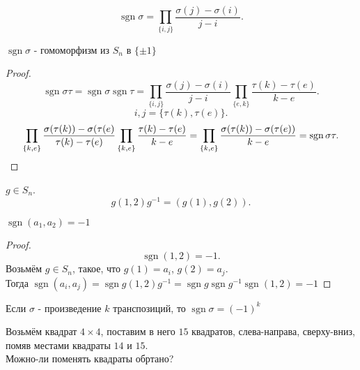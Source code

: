 \documentclass[11pt, oneside]{article}   	%
\DeclareMathOperator{\sgn}{sgn}
\begin{document}
    \begin{dlemma}
        \[ \sgn \sigma = \prod\limits_{\{i, j\}} \frac{\sigma(j)-\sigma(i)}{j-i}   .\] 
    \end{dlemma}
    \begin{dlemma}
        $\sgn \sigma$ - гомоморфизм из $S_n$ в $\{\pm 1\} $
        \begin{proof}
            \[ \sgn \sigma\tau = \sgn\sigma\sgn\tau = \prod\limits_{\{i,j\}} \frac{\sigma(j)-\sigma(i)}{j-i}\prod\limits_{\{e, k\}} \frac{\tau(k)-\tau(e)}{k-e}     .\]
        \[ {i, j} = \{\tau(k), \tau(e)\}   .\] 
        \[ \prod\limits_{\{k, e\} } \frac{\sigma(\tau(k))-\sigma(\tau(e)}{\tau(k)-\tau(e)}\prod\limits_{\{k, e\} }\frac{\tau(k)-\tau(e)}{k-e} = \prod\limits_{\{k, e\} } \frac{\sigma(\tau(k))-\sigma(\tau(e))}{k-e} = \sgn \sigma\tau      .\qedhere\] 
        \end{proof}
    \end{dlemma}
    \begin{dlemma}
        $g\in S_n$.\\
        \[ g(1,2)g^{-1} = (g(1),g(2)) .\] 
    \end{dlemma}
    \begin{dlemma}
        $\sgn (a_1, a_2) = -1$
        \begin{proof}
            \[ \sgn (1,2) = -1 .\]
            Возьмём $g\in S_n$, такое, что $g(1)=a_i$, $g(2)=a_j$.\\
            Тогда $\sgn(a_i, a_j) = \sgn g(1,2)g^{-1} = \sgn g\sgn g^{-1} \sgn(1,2) = -1$
        \end{proof}
    \end{dlemma}
    \begin{dlemma}
        Если $\sigma$ - произведение $k$ транспозиций, то $\sgn \sigma = (-1)^{k}$
    \end{dlemma}
    \begin{definition}[Игра в $15$]
        Возьмём квадрат $4\times 4$, поставим в него $15$ квадратов, слева-направа, сверху-вниз, помяв местами квадраты $14$ и $15$.\\
        Можно-ли поменять квадраты обртано?
    \end{definition}
\end{document}
